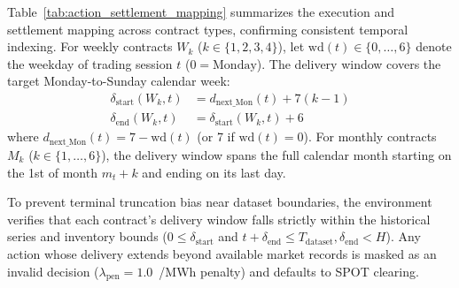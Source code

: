 Table~\ref{tab:action_settlement_mapping} summarizes the execution and settlement mapping across contract types, confirming consistent temporal indexing. For weekly contracts $W_k$ ($k \in \{1, 2, 3, 4\}$), let $\text{wd}(t) \in \{0, \dots, 6\}$ denote the weekday of trading session $t$ ($0 = \text{Monday}$). The delivery window covers the target Monday-to-Sunday calendar week:
\begin{align}
    \delta_{\text{start}}(W_k, t) &= d_{\text{next\_Mon}}(t) + 7(k-1) \\
    \delta_{\text{end}}(W_k, t) &= \delta_{\text{start}}(W_k, t) + 6
\end{align}
where $d_{\text{next\_Mon}}(t) = 7 - \text{wd}(t)$ (or 7 if $\text{wd}(t)=0$). For monthly contracts $M_k$ ($k \in \{1, \dots, 6\}$), the delivery window spans the full calendar month starting on the 1st of month $m_t + k$ and ending on its last day. 

To prevent terminal truncation bias near dataset boundaries, the environment verifies that each contract's delivery window falls strictly within the historical series and inventory bounds ($0 \le \delta_{\text{start}}$ and $t + \delta_{\text{end}} \le T_{\text{dataset}}, \delta_{\text{end}} < H$). Any action whose delivery extends beyond available market records is masked as an invalid decision ($\lambda_{\text{pen}} = 1.0$~\texteuro/MWh penalty) and defaults to SPOT clearing.

